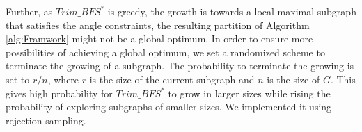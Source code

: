 Further, as $Trim\_BFS^*$ is greedy, the growth is towards a local maximal subgraph that satisfies the angle constraints, the resulting partition of Algorithm \ref{alg:Framwork} might not be a global optimum. In order to ensure more possibilities of achieving a global optimum, we set a randomized scheme to terminate the growing of a subgraph. The probability to terminate the growing is set to $r/n$, where $r$ is the size of the current subgraph and $n$ is the size of $G$. This gives high probability for $Trim\_BFS^*$ to grow in larger sizes while rising the probability of exploring subgraphs of smaller sizes. We implemented it using rejection sampling.











